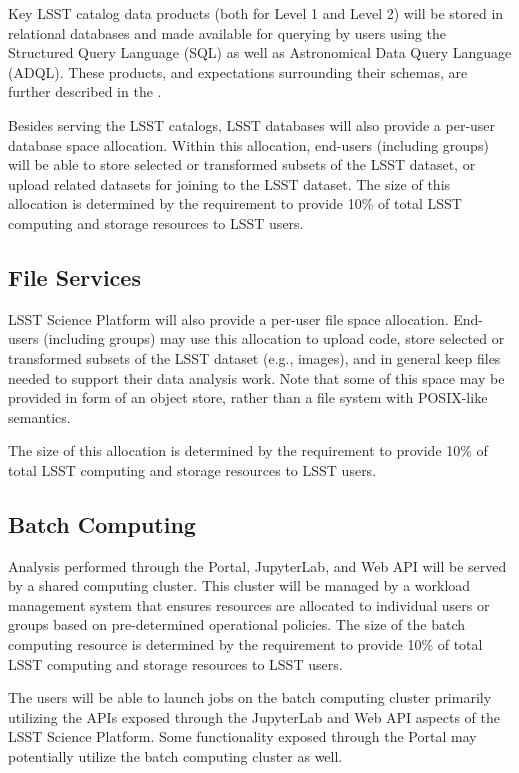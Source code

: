\documentclass[DM,lsstdraft,toc]{lsstdoc}
\begin{document}
Key LSST catalog data products (both for Level 1 and Level 2) will be stored in relational databases and made available for querying by users using the Structured Query Language (SQL) as well as Astronomical Data Query Language (ADQL). These products, and expectations surrounding their schemas, are further described in the \DPDD.

Besides serving the LSST catalogs, LSST databases will also provide a per-user database space allocation. Within this allocation, end-users (including groups) will be able to store selected or transformed subsets of the LSST dataset, or upload related datasets for joining to the LSST dataset. The size of this allocation is determined by the \SRD requirement to provide 10\% of total LSST computing and storage resources to LSST users.

\subsection{File Services}

LSST Science Platform will also provide a per-user file space allocation. End-users (including groups) may use this allocation to upload code, store selected or transformed subsets of the LSST dataset (e.g., images), and in general keep files needed to support their data analysis work. Note that some of this space may be provided in form of an object store, rather than a file system with POSIX-like semantics.

The size of this allocation is determined by the \SRD requirement to provide 10\% of total LSST computing and storage resources to LSST users.

\subsection{Batch Computing}

Analysis performed through the Portal, JupyterLab, and Web API will be served by a shared computing cluster. This cluster will be managed by a workload management system that ensures resources are allocated to individual users or groups based on pre-determined operational policies. The size of the batch computing resource is determined by the \SRD requirement to provide 10\% of total LSST computing and storage resources to LSST users.

The users will be able to launch jobs on the batch computing cluster primarily utilizing the APIs exposed through the JupyterLab and Web API aspects of the LSST Science Platform. Some functionality exposed through the Portal may potentially utilize the batch computing cluster as well.
\end{document}
